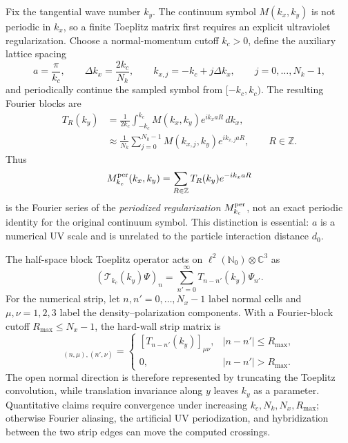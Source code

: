 \documentclass[11pt]{article}
\numberwithin{equation}{section}
\begin{document}
Fix the tangential wave number $k_y$.  The continuum symbol
$M(k_x,k_y)$ is not periodic in $k_x$, so a finite Toeplitz matrix first
requires an explicit ultraviolet regularization.  Choose a normal-momentum
cutoff $k_c>0$, define the auxiliary lattice spacing
\begin{equation}
  a=\frac{\pi}{k_c},
  \qquad
  \Delta k_x=\frac{2k_c}{N_k},
  \qquad
  k_{x,j}=-k_c+j\Delta k_x,\qquad j=0,\ldots,N_k-1,
  \label{eq:strip_uv_grid}
\end{equation}
and periodically continue the sampled symbol from $[-k_c,k_c)$.  The
resulting Fourier blocks are
\begin{align}
  T_R(k_y)
  &=\frac{1}{2k_c}\int_{-k_c}^{k_c}
    M(k_x,k_y)e^{ik_xaR}\,dk_x,\nonumber\\
  &\approx\frac{1}{N_k}\sum_{j=0}^{N_k-1}
    M(k_{x,j},k_y)e^{ik_{x,j}aR},
  \qquad R\in\mathbb Z .
  \label{eq:strip_fourier_blocks}
\end{align}
Thus
\begin{equation}
  M_{k_c}^{\rm per}(k_x,k_y)
  =\sum_{R\in\mathbb Z}T_R(k_y)e^{-ik_xaR}
  \label{eq:periodized_strip_symbol}
\end{equation}
is the Fourier series of the \emph{periodized regularization}
$M_{k_c}^{\rm per}$, not an exact periodic identity for the original
continuum symbol.  This distinction is essential: $a$ is a numerical UV
scale and is unrelated to the particle interaction distance $d_0$.

The half-space block Toeplitz operator acts on
$\ell^2(\mathbb N_0)\otimes\mathbb C^3$ as
\begin{equation}
  (\mathcal T_{k_c}(k_y)\Psi)_n
  =\sum_{n'=0}^{\infty}T_{n-n'}(k_y)\Psi_{n'} .
  \label{eq:half_space_toeplitz}
\end{equation}
For the numerical strip, let $n,n'=0,\ldots,N_x-1$ label normal cells and
$\mu,\nu=1,2,3$ label the density--polarization components.  With a
Fourier-block cutoff $R_{\max}\leq N_x-1$, the hard-wall strip matrix is
\begin{equation}
  [\mathcal L_{\rm strip}(k_y)]_{(n,\mu),(n',\nu)}
  =
  \begin{cases}
    [T_{n-n'}(k_y)]_{\mu\nu},&|n-n'|\leq R_{\max},\\
    0,&|n-n'|>R_{\max}.
  \end{cases}
  \label{eq:strip_matrix_appendix}
\end{equation}
The open normal direction is therefore represented by truncating the
Toeplitz convolution, while translation invariance along $y$ leaves $k_y$
as a parameter.  Quantitative claims require convergence under increasing
$k_c,N_k,N_x,R_{\max}$; otherwise Fourier aliasing, the artificial UV
periodization, and hybridization between the two strip edges can move the
computed crossings.
\end{document}
